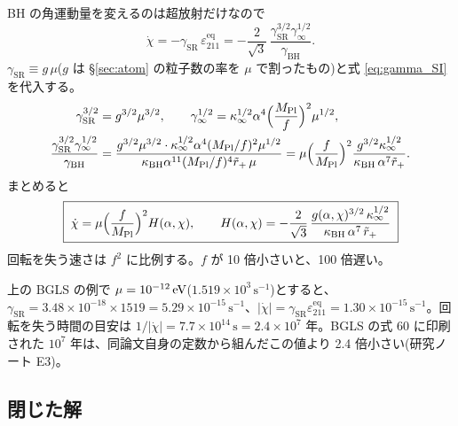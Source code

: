 BH の角運動量を変えるのは超放射だけなので
\begin{equation}
\dot\chi=-\gamma_\mathrm{SR}\,\varepsilon_{211}^\mathrm{eq}=-\frac{2}{\sqrt3}\,\frac{\gamma_\mathrm{SR}^{3/2}\gamma_\infty^{1/2}}{\gamma_\mathrm{BH}}.
\label{eq:chidot}
\end{equation}
$\gamma_\mathrm{SR}\equiv g\,\mu$($g$ は \S\ref{sec:atom} の粒子数の率を $\mu$ で割ったもの)と式 \eqref{eq:gamma_SI} を代入する。
\begin{align}
\gamma_\mathrm{SR}^{3/2}&=g^{3/2}\mu^{3/2},\qquad
\gamma_\infty^{1/2}=\kappa_\infty^{1/2}\alpha^4\Bigl(\frac{M_\mathrm{Pl}}{f}\Bigr)^2\mu^{1/2},\notag\\
\frac{\gamma_\mathrm{SR}^{3/2}\gamma_\infty^{1/2}}{\gamma_\mathrm{BH}}
&=\frac{g^{3/2}\mu^{3/2}\cdot\kappa_\infty^{1/2}\alpha^4(M_\mathrm{Pl}/f)^2\mu^{1/2}}{\kappa_\mathrm{BH}\alpha^{11}(M_\mathrm{Pl}/f)^4\tilde r_+\,\mu}
=\mu\Bigl(\frac{f}{M_\mathrm{Pl}}\Bigr)^2\frac{g^{3/2}\kappa_\infty^{1/2}}{\kappa_\mathrm{BH}\,\alpha^7\tilde r_+}.
\end{align}
まとめると
\begin{equation}
\boxed{\;\dot\chi=\mu\Bigl(\frac{f}{M_\mathrm{Pl}}\Bigr)^2H(\alpha,\chi),\qquad
H(\alpha,\chi)=-\frac{2}{\sqrt3}\,\frac{g(\alpha,\chi)^{3/2}\,\kappa_\infty^{1/2}}{\kappa_\mathrm{BH}\,\alpha^7\,\tilde r_+}\;}
\label{eq:chidot_H}
\end{equation}
回転を失う速さは $f^2$ に比例する。$f$ が 10 倍小さいと、100 倍遅い。

\begin{numcheck}
上の BGLS の例で $\mu=10^{-12}\,\mathrm{eV}$($1.519\times10^3\,\mathrm{s}^{-1}$)とすると、$\gamma_\mathrm{SR}=3.48\times10^{-18}\times1519=5.29\times10^{-15}\,\mathrm{s}^{-1}$、$|\dot\chi|=\gamma_\mathrm{SR}\varepsilon_{211}^\mathrm{eq}=1.30\times10^{-15}\,\mathrm{s}^{-1}$。回転を失う時間の目安は $1/|\dot\chi|=7.7\times10^{14}\,\mathrm{s}=2.4\times10^7$ 年。BGLS の式 60 に印刷された $10^7$ 年は、同論文自身の定数から組んだこの値より 2.4 倍小さい(研究ノート E3)。
\end{numcheck}

\subsection{閉じた解}

